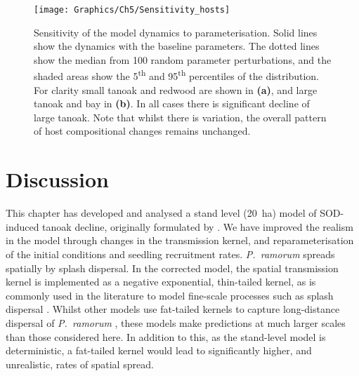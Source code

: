 \begin{figure}
    \begin{center}
        \texttt{[image: Graphics/Ch5/Sensitivity\_hosts]}
        \caption[Sensitivity of model dynamics]{Sensitivity of the model dynamics to parameterisation. Solid lines show the dynamics with the baseline parameters. The dotted lines show the median from 100 random parameter perturbations, and the shaded areas show the 5\textsuperscript{th} and 95\textsuperscript{th} percentiles of the distribution. For clarity small tanoak and redwood are shown in \textbf{(a)}, and large tanoak and bay in \textbf{(b)}. In all cases there is significant decline of large tanoak. Note that whilst there is variation, the overall pattern of host compositional changes remains unchanged.\label{fig:ch5:model_sensitivity}}
    \end{center}
\end{figure}
\FloatBarrier

\section{Discussion\label{sec:ch5:discussion}}

This chapter has developed and analysed a stand level (\SI{20}{\hectare}) model of SOD-induced tanoak decline, originally formulated by \citet{cobb_ecosystem_2012}. We have improved the realism in the model through changes in the transmission kernel, and reparameterisation of the initial conditions and seedling recruitment rates. \emph{P.~ramorum} spreads spatially by splash dispersal. In the corrected model, the spatial transmission kernel is implemented as a negative exponential, thin-tailed kernel, as is commonly used in the literature to model fine-scale processes such as splash dispersal \citep{skelsey_pest_2013}. Whilst other models use fat-tailed kernels to capture long-distance dispersal of \emph{P.~ramorum} \citep[e.g.][]{meentemeyer_epidemiological_2011}, these models make predictions at much larger scales than those considered here. In addition to this, as the stand-level model is deterministic, a fat-tailed kernel would lead to significantly higher, and unrealistic, rates of spatial spread.

